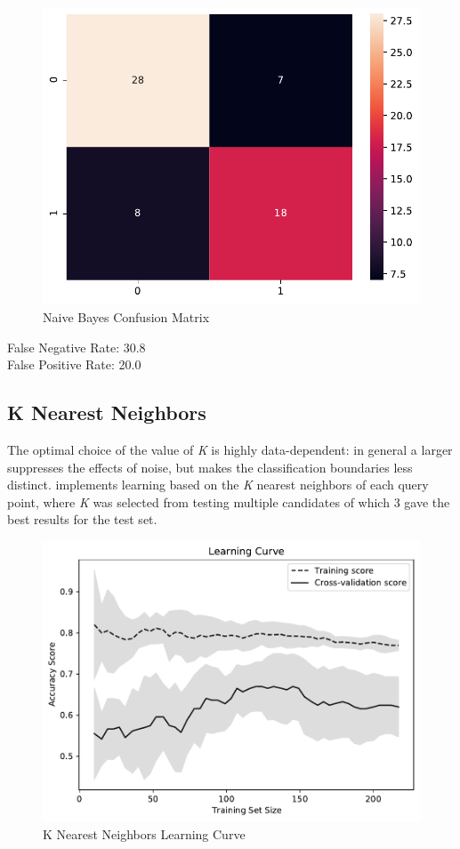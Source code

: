 \documentclass[conference]{IEEEtran}
\begin{document}
\begin{figure}[H]
    \centerline{\includegraphics[width=0.8\linewidth]{images/naive_bayes_cm.pdf}}
    \caption{Naive Bayes Confusion Matrix}
    \label{nb_cm}
\end{figure}

\noindent
False Negative Rate: 30.8
\\False Positive Rate: 20.0
\newpage

\subsection{K Nearest Neighbors}
The optimal choice of the value of \textit{K} is highly data-dependent: in general a larger suppresses the effects of noise, but makes the classification boundaries less distinct. implements learning based on the \textit{K} nearest neighbors of each query point, where \textit{K} was selected from testing multiple candidates of which 3 gave the best results for the test set.

\begin{figure}[H]
    \centerline{\includegraphics[width=0.9\linewidth]{images/KNeighborsClassifier_lc.pdf}}
    \caption{K Nearest Neighbors Learning Curve}
    \label{knn_lc}
\end{figure}
\end{document}
